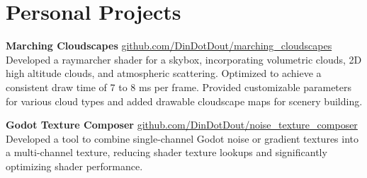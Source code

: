 \documentclass[10pt]{article}       %
\begin{document}
\vspace{-18.5pt}

\section*{Personal Projects}
\textbf{Marching Cloudscapes} \hfill \href{https://github.com/DinDotDout/marching_cloudscapes}{github.com/DinDotDout/marching\_cloudscapes} \\

Developed a raymarcher shader for a skybox, incorporating volumetric clouds, 2D high altitude clouds,
and atmospheric scattering. Optimized to achieve a consistent draw time of 7 to 8 ms per frame. Provided customizable
parameters for various cloud types and added drawable cloudscape maps for scenery building.


\vspace{5pt}
\textbf{Godot Texture Composer} \hfill \href{https://github.com/DinDotDout/noise_texture_composer}{github.com/DinDotDout/noise\_texture\_composer} \\
Developed a tool to combine single-channel Godot noise or gradient textures into a multi-channel
texture, reducing shader texture lookups and significantly optimizing shader performance.
\end{document}

